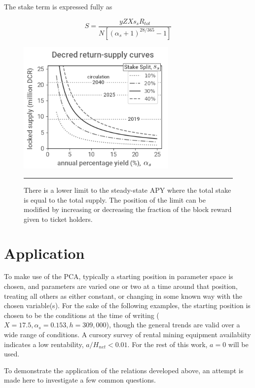 \documentclass[a4paper,12pt]{article}
\begin{document}
The stake term is expressed fully as

\begin{equation}
S = \frac{ yZXs_sR_{tot} }{ N [ ( \alpha_s + 1)^{28/365} - 1 ] }
\end{equation} 

%
\begin{figure}[!t]
	\begin{center}
	\includegraphics[width=3.05in]{returnsupply}
\begin{minipage}[t]{0.85\textwidth}
	\caption{There is a lower limit to the steady-state APY where the total stake is equal to the total supply. The position of the limit can be modified by increasing or decreasing the fraction of the block reward given to ticket holders. \label{returnsupplyfig}}
	\end{minipage}
  	\end{center}
	\hrule
\end{figure}
%

\section{Application}

To make use of the PCA, typically a starting position in parameter space is chosen, and parameters are varied one or two at a time around that position, treating all others as either constant, or changing in some known way with the chosen variable(s). For the sake of the following examples, the starting position is chosen to be the conditions at the time of writing ($ X = 17.5, \alpha_s = 0.153, h=309,000 $), though the general trends are valid over a wide range of conditions. A cursory survey of rental mining equipment availabiity indicates a low rentability, $ a / H_{net} < 0.01 $. For the rest of this work, $ a = 0 $ will be used.

To demonstrate the application of the relations developed above, an attempt is made here to investigate a few common questions. 
\end{document}
